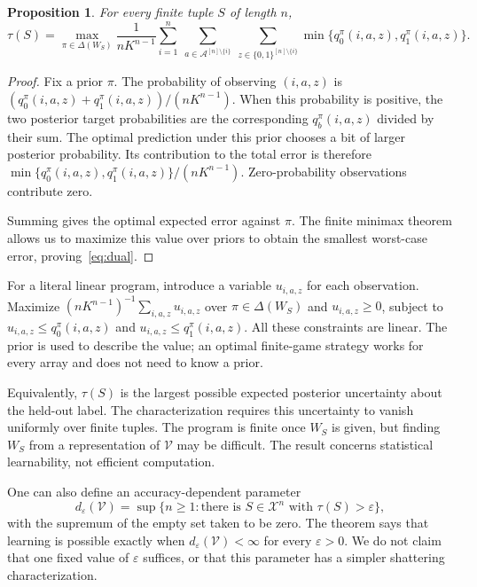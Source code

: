 \documentclass[11pt]{article}
\newcommand{\X}{\mathcal X}
\newcommand{\V}{\mathcal V}
\newcommand{\A}{\mathcal A}
\newtheorem{proposition}[theorem]{Proposition}
\begin{document}
\begin{proposition}\label{prop:dual}
For every finite tuple $S$ of length $n$,
\begin{equation}\label{eq:dual}
\tau(S)=\max_{\pi\in\Delta(W_S)}
\frac{1}{nK^{n-1}}
\sum_{i=1}^n\ \sum_{a\in\A^{[n]\setminus\{i\}}}
\ \sum_{z\in\{0,1\}^{[n]\setminus\{i\}}}
\min\{q_0^\pi(i,a,z),q_1^\pi(i,a,z)\}.
\end{equation}
\end{proposition}
\begin{proof}
Fix a prior $\pi$. The probability of observing $(i,a,z)$ is
$(q_0^\pi(i,a,z)+q_1^\pi(i,a,z))/(nK^{n-1})$. When this probability is
positive, the two posterior target probabilities are the corresponding
$q_b^\pi(i,a,z)$ divided by their sum. The optimal prediction under this
prior chooses a bit of larger posterior probability. Its contribution to
the total error is therefore
$\min\{q_0^\pi(i,a,z),q_1^\pi(i,a,z)\}/(nK^{n-1})$.
Zero-probability observations contribute zero.

Summing gives the optimal expected error against $\pi$. The finite minimax
theorem allows us to maximize this value over priors to obtain the
smallest worst-case error, proving~\eqref{eq:dual}.
\end{proof}

For a literal linear program, introduce a variable $u_{i,a,z}$ for each
observation. Maximize $(nK^{n-1})^{-1}\sum_{i,a,z}u_{i,a,z}$ over
$\pi\in\Delta(W_S)$ and $u_{i,a,z}\ge0$, subject to
$u_{i,a,z}\le q_0^\pi(i,a,z)$ and
$u_{i,a,z}\le q_1^\pi(i,a,z)$. All these constraints are linear.
The prior is used to describe the value; an optimal finite-game strategy
works for every array and does not need to know a prior.

Equivalently, $\tau(S)$ is the largest possible expected posterior
uncertainty about the held-out label. The characterization requires this
uncertainty to vanish uniformly over finite tuples. The program is finite
once $W_S$ is given, but finding $W_S$ from a representation of $\V$ may
be difficult. The result concerns statistical learnability, not efficient
computation.

One can also define an accuracy-dependent parameter
\[
d_\varepsilon(\V)=
\sup\{n\ge1:\text{there is }S\in\X^n
                       \text{ with }\tau(S)>\varepsilon\},
\]
with the supremum of the empty set taken to be zero. The theorem says that
learning is possible exactly when $d_\varepsilon(\V)<\infty$ for every
$\varepsilon>0$. We do not claim that one fixed value of $\varepsilon$
suffices, or that this parameter has a simpler shattering characterization.
\end{document}
